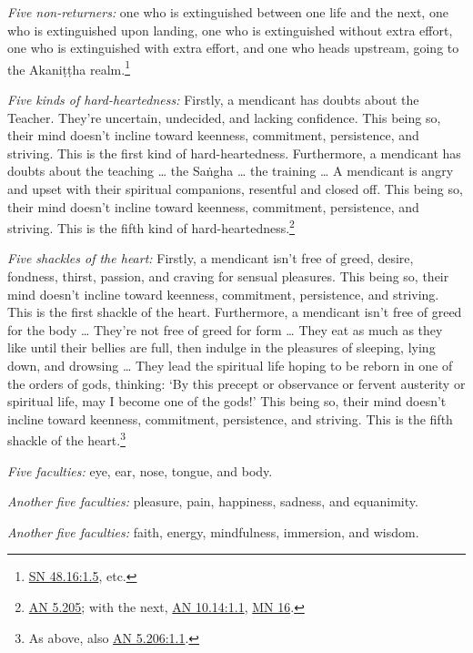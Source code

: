 \documentclass[12pt,openany]{book}%
\begin{document}
\emph{Five non-returners:} one who is extinguished between one life and the next, one who is extinguished upon landing, one who is extinguished without extra effort, one who is extinguished with extra effort, and one who heads upstream, going to the \textsanskrit{Akaniṭṭha} realm.\footnote{\href{https://suttacentral.net/sn48.16/en/sujato\#1.5}{SN 48.16:1.5}, etc. } 

\emph{Five kinds of hard-heartedness:} Firstly, a mendicant has doubts about the Teacher. They’re uncertain, undecided, and lacking confidence. This being so, their mind doesn’t incline toward keenness, commitment, persistence, and striving. This is the first kind of hard-heartedness. Furthermore, a mendicant has doubts about the teaching … the \textsanskrit{Saṅgha} … the training … A mendicant is angry and upset with their spiritual companions, resentful and closed off. This being so, their mind doesn’t incline toward keenness, commitment, persistence, and striving. This is the fifth kind of hard-heartedness.\footnote{\href{https://suttacentral.net/an5.205/en/sujato}{AN 5.205}; with the next, \href{https://suttacentral.net/an10.14/en/sujato\#1.1}{AN 10.14:1.1}, \href{https://suttacentral.net/mn16/en/sujato}{MN 16}. } 

\emph{Five shackles of the heart:} Firstly, a mendicant isn’t free of greed, desire, fondness, thirst, passion, and craving for sensual pleasures. This being so, their mind doesn’t incline toward keenness, commitment, persistence, and striving. This is the first shackle of the heart. Furthermore, a mendicant isn’t free of greed for the body … They’re not free of greed for form … They eat as much as they like until their bellies are full, then indulge in the pleasures of sleeping, lying down, and drowsing … They lead the spiritual life hoping to be reborn in one of the orders of gods, thinking: ‘By this precept or observance or fervent austerity or spiritual life, may I become one of the gods!’ This being so, their mind doesn’t incline toward keenness, commitment, persistence, and striving. This is the fifth shackle of the heart.\footnote{As above, also \href{https://suttacentral.net/an5.206/en/sujato\#1.1}{AN 5.206:1.1}. } 

\emph{Five faculties:} eye, ear, nose, tongue, and body. 

\emph{Another five faculties:} pleasure, pain, happiness, sadness, and equanimity. 

\emph{Another five faculties:} faith, energy, mindfulness, immersion, and wisdom. 
\end{document}
